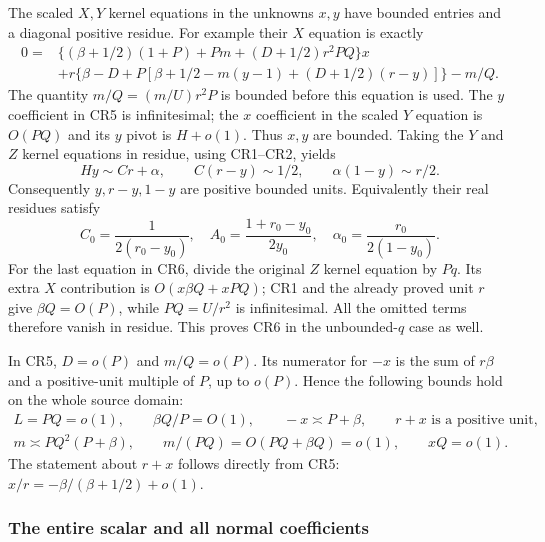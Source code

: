 The scaled $X,Y$ kernel equations in the unknowns $x,y$ have
bounded entries and a diagonal positive residue. For example their
$X$ equation is exactly
\[
\begin{split}
 0={}&\{(\beta+1/2)(1+P)+Pm+(D+1/2)r^2PQ\}x\\
 &+r\{\beta-D+P[\beta+1/2-m(y-1)+(D+1/2)(r-y)]\}-m/Q.
\end{split}\tag{CR5}
\]
The quantity $m/Q=(m/U)r^2P$ is bounded before this equation is
used. The $y$ coefficient in CR5 is infinitesimal; the $x$
coefficient in the scaled $Y$ equation is $O(PQ)$ and its $y$
pivot is $H+o(1)$. Thus $x,y$ are bounded. Taking the $Y$ and
$Z$ kernel equations in residue, using CR1--CR2, yields
\[
 Hy\sim Cr+\alpha,\qquad C(r-y)\sim1/2,
 \qquad \alpha(1-y)\sim r/2.
 \tag{CR6}
\]
Consequently $y,r-y,1-y$ are positive bounded units. Equivalently
their real residues satisfy
\[
 C_0=\frac1{2(r_0-y_0)},\quad
 A_0=\frac{1+r_0-y_0}{2y_0},\quad
 \alpha_0=\frac{r_0}{2(1-y_0)}.
 \tag{CR7}
\]
For the last equation in CR6, divide the original $Z$ kernel
equation by $Pq$. Its extra $X$ contribution is
$O(x\beta Q+xPQ)$; CR1 and the already proved unit $r$ give
$\beta Q=O(P)$, while $PQ=U/r^2$ is infinitesimal. All the
omitted terms therefore vanish in residue. This proves CR6 in the
unbounded-$q$ case as well.

In CR5, $D=o(P)$ and $m/Q=o(P)$. Its numerator for $-x$ is
the sum of $r\beta$ and a positive-unit multiple of $P$, up to
$o(P)$. Hence the following bounds hold on the whole source domain:
\[
\begin{gathered}
 L=PQ=o(1),\qquad \beta Q/P=O(1),\qquad
 -x\asymp P+\beta,\qquad r+x\text{ is a positive unit},\\
 m\asymp PQ^2(P+\beta),\qquad
 m/(PQ)=O(PQ+\beta Q)=o(1),\qquad xQ=o(1).
\end{gathered}\tag{CR8}
\]
The statement about $r+x$ follows directly from CR5:
$x/r=-\beta/(\beta+1/2)+o(1)$.

\subsubsection*{The entire scalar and all normal coefficients}

